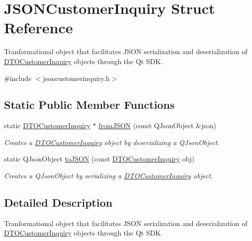 \hypertarget{struct_j_s_o_n_customer_inquiry}{}\section{J\+S\+O\+N\+Customer\+Inquiry Struct Reference}
\label{struct_j_s_o_n_customer_inquiry}


Tranformational object that facilitates J\+S\+ON serialization and deserialization of \mbox{\hyperlink{struct_d_t_o_customer_inquiry}{D\+T\+O\+Customer\+Inquiry}} objects through the Qt S\+DK.  




{\ttfamily \#include $<$jsoncustomerinquiry.\+h$>$}

\subsection*{Static Public Member Functions}
\begin{DoxyCompactItemize}
\item 
static \mbox{\hyperlink{struct_d_t_o_customer_inquiry}{D\+T\+O\+Customer\+Inquiry}} $\ast$ \mbox{\hyperlink{struct_j_s_o_n_customer_inquiry_a9b0e309ca1a6e1794f7f3473d42a7d2b}{from\+J\+S\+ON}} (const Q\+Json\+Object \&json)
\begin{DoxyCompactList}\small\item\em Creates a \mbox{\hyperlink{struct_d_t_o_customer_inquiry}{D\+T\+O\+Customer\+Inquiry}} object by deserializing a Q\+Json\+Object. \end{DoxyCompactList}\item 
static Q\+Json\+Object \mbox{\hyperlink{struct_j_s_o_n_customer_inquiry_ac470def01a19da61aec37311cb2ed438}{to\+J\+S\+ON}} (const \mbox{\hyperlink{struct_d_t_o_customer_inquiry}{D\+T\+O\+Customer\+Inquiry}} obj)
\begin{DoxyCompactList}\small\item\em Creates a Q\+Json\+Object by serializing a \mbox{\hyperlink{struct_d_t_o_customer_inquiry}{D\+T\+O\+Customer\+Inquiry}} object. \end{DoxyCompactList}\end{DoxyCompactItemize}


\subsection{Detailed Description}
Tranformational object that facilitates J\+S\+ON serialization and deserialization of \mbox{\hyperlink{struct_d_t_o_customer_inquiry}{D\+T\+O\+Customer\+Inquiry}} objects through the Qt S\+DK. 



